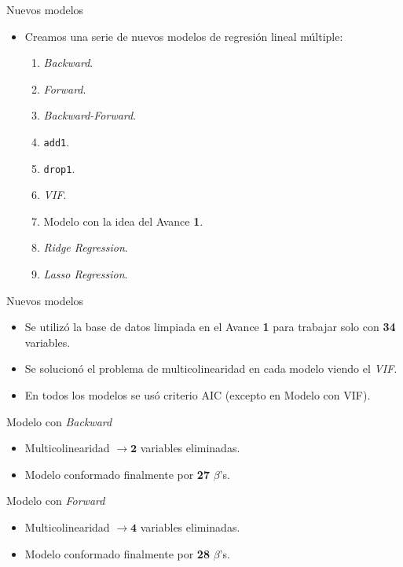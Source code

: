 \documentclass[11pt]{beamer}
\newcommand{\B}{\beta}
\newcommand{\cod}[1]{\texttt{\frenchspacing#1}}
\begin{document}
\begin{frame}{Nuevos modelos}
	\begin{itemize}
		\item Creamos una serie de nuevos modelos de regresión lineal múltiple:
		\begin{enumerate}
			\item \textit{Backward}.
			\pause
			\item \textit{Forward}.
			\pause
			\item \textit{Backward-Forward}.
			\pause
			\item \cod{add1}.
			\pause
			\item \cod{drop1}.
			\pause
			\item \textit{VIF}.
			\pause
			\item Modelo con la idea del Avance \textbf{1}.
			\pause
			\item \textit{Ridge Regression}.
			\pause
			\item \textit{Lasso Regression}.
		\end{enumerate}
	\end{itemize}
\end{frame}

\begin{frame}{Nuevos modelos}
	\begin{itemize}
		\item Se utilizó la base de datos limpiada en el Avance \textbf{1} para trabajar solo con \textbf{34} variables.
		\pause
		\item Se solucionó el problema de multicolinearidad en cada modelo viendo el \textit{VIF}.
		\pause
		\item En todos los modelos se usó criterio AIC (excepto en Modelo con VIF).
	\end{itemize}
\end{frame}

\begin{frame}{Modelo con \textit{Backward}}
	\begin{itemize}
		\item Multicolinearidad $\to \mathbf{2}$ variables eliminadas.
		\pause
		\item Modelo conformado finalmente por \textbf{27} $\B$'s.
	\end{itemize}
\end{frame}

\begin{frame}{Modelo con \textit{Forward}}
	\begin{itemize}
		\item Multicolinearidad $\to \mathbf{4}$ variables eliminadas.
		\pause
		\item Modelo conformado finalmente por \textbf{28} $\B$'s.
	\end{itemize}
\end{frame}
\end{document}
